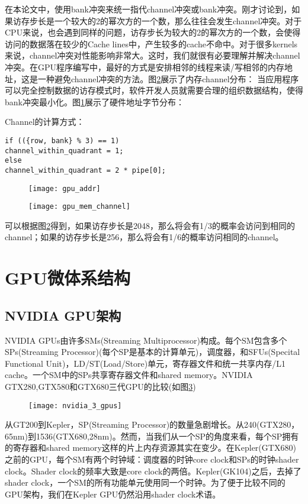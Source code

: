 在本论文中，使用bank冲突来统一指代channel冲突或bank冲突。刚才讨论到，如果访存步长是一个较大的2的幂次方的一个数，那么往往会发生channel冲突。对于CPU来说，也会遇到同样的问题，访存步长为较大的2的幂次方的一个数，会使得访问的数据落在较少的Cache lines中，产生较多的cache不命中。对于很多kernels来说，channel冲突对性能影响非常大。这时，我们就很有必要理解并解决channel冲突。在GPU程序编写中，最好的方式是安排相邻的线程来读/写相邻的内存地址，这是一种避免channel冲突的方法。图\ref{fig:gpu_mem_channel}展示了内存channel分布：
当应用程序可以完全控制数据的访存模式时，软件开发人员就需要合理的组织数据结构，使得bank冲突最小化。图\ref{fig:gpu_addr}展示了硬件地址字节分布：

Channel的计算方式：

\lstset{language=C}
\begin{lstlisting}
if (({row, bank} % 3) == 1)
channel_within_quadrant = 1;
else
channel_within_quadrant = 2 * pipe[0];
\end{lstlisting}

\begin{figure}[htbp]
	\centering
	\texttt{[image: gpu\_addr]}
	\label{fig:gpu_addr}
\end{figure}


\begin{figure}[htbp]
	\centering
	\texttt{[image: gpu\_mem\_channel]}
	\label{fig:gpu_mem_channel}
\end{figure}

可以根据图\ref{fig:gpu_mem_channel}得到，如果访存步长是2048，那么将会有1/3的概率会访问到相同的channel；如果的访存步长是256，那么将会有1/6的概率访问相同的channel。

\section{GPU微体系结构}
\subsection{NVIDIA GPU架构}
NVIDIA GPUs由许多SMs(Streaming Multiprocessor)构成。每个SM包含多个SPs(Streaming Processor)(每个SP是基本的计算单元)，调度器，和SFUs(Specital Functional Unit)，LD/ST(Load/Store)单元，寄存器文件和统一共享内存/L1 cache。一个SM中的SPs共享寄存器文件和shared memory。NVIDIA GTX280,GTX580和GTX680三代GPU的比较(如图\ref{fig:nvidia_3_gpus})
\begin{figure}[htbp]
	\centering
	\texttt{[image: nvidia\_3\_gpus]}
	\label{fig:nvidia_3_gpus}
\end{figure}
从GT200到Kepler，SP(Streaming Processor)的数量急剧增长。从240(GTX280，65nm)到1536(GTX680,28nm)。然而，当我们从一个SP的角度来看，每个SP拥有的寄存器和shared memory这样的片上内存资源其实在变少。在Kepler(GTX680)之前的GPU，每个SM有两个时钟域：调度器的时钟core clock和SPs的时钟shader clock。Shader clock的频率大致是core clock的两倍。Kepler(GK104)之后，去掉了shader clock，一个SM的所有功能单元使用同一个时钟。为了便于比较不同的GPU架构，我们在Kepler GPU仍然沿用shader clock术语。

